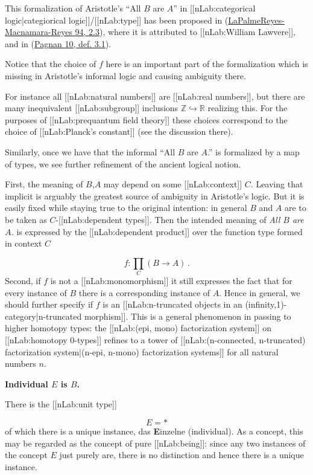 \documentclass[12pt,titlepage]{article}
\theoremstyle{plain}
\theoremstyle{definition}
\theoremstyle{remark}
\begin{document}
This formalization of Aristotle's ``All $B$ are $A$'' in [[nLab:categorical logic|categiorical logic]]/[[nLab:type]] has been proposed in (\hyperlink{PalmeReyesMacnamaraReyes94}{LaPalmeReyes-Macnamara-Reyes 94, 2.3}), where it is attributed to [[nLab:William Lawvere]], and in (\hyperlink{Pagnan10}{Pagnan 10, def. 3.1}).

Notice that the choice of $f$ here is an important part of the formalization which is missing in Aristotle's informal logic and causing ambiguity there.

For instance all [[nLab:natural numbers]] are [[nLab:real numbers]], but there are many inequivalent [[nLab:subgroup]] inclusions $\mathbb{Z}\hookrightarrow \mathbb{R}$ realizing this. For the purposes of [[nLab:prequantum field theory]] these choices correspond to the choice of [[nLab:Planck's constant]] (see the discussion there).

Similarly, once we have that the informal ``All $B$ are $A$.'' is formalized by a map of types, we see further refinement of the ancient logical notion.

First, the meaning of $B$,$A$ may depend on some [[nLab:context]] $C$. Leaving that implicit is arguably the greatest source of ambiguity in Aristotle's logic. But it is easily fixed while staying true to the original intention: in general $B$ and $A$ are to be taken as $C$-[[nLab:dependent types]]. Then the intended meaning of \emph{All $B$ are $A$.} is expressed by the [[nLab:dependent product]] over the function type formed in context $C$

\begin{displaymath}
f\colon \underset{C}{\prod} (B \longrightarrow A)
  \,.
\end{displaymath}
Second, if $f$ is not a [[nLab:monomorphism]] it still expresses the fact that for every instance of $B$ there is a corresponding instance of $A$. Hence in general, we should further specify if $f$ is an [[nLab:n-truncated objects in an (infinity,1)-category|n-truncated morphism]]. This is a general phenomenon in passing to higher homotopy types: the [[nLab:(epi, mono) factorization system]] on [[nLab:homotopy 0-types]] refines to a tower of [[nLab:(n-connected, n-truncated) factorization system|(n-epi, n-mono) factorization systems]] for all natural numbers $n$.

\textbf{Individual $E$ is $B$.}

There is the [[nLab:unit type]]

\begin{displaymath}
E = \ast
\end{displaymath}
of which there is a unique instance, das \textbf{E}inzelne (individual). As a concept, this may be regarded as the concept of pure [[nLab:being]]: since any two instances of the concept $E$ just purely are, there is no distinction and hence there is a unique instance.
\end{document}
